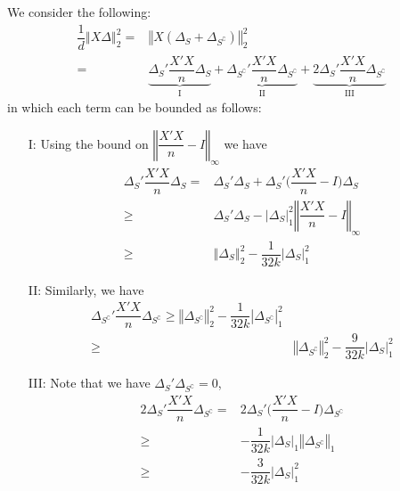 \documentclass[11pt,a4paper]{ctexart}
\numberwithin{equation}{section}%
\begin{document}
We consider the following:
\begin{align*}
    \dfrac{ 1 }{ d } \left\Vert X\Delta \right\Vert _2^2 =& \left\Vert X(\Delta _S+\Delta _{S^\complement}) \right\Vert _2^2 \\
    =& \underbrace{ \Delta _S'\dfrac{ X'X }{ n  } \Delta _S}_{\text{I}} + \underbrace{ \Delta _{S^\complement}'\dfrac{ X'X }{ n  } \Delta _{S^\complement}  }_{\text{II}} + \underbrace{ 2\Delta _S'\dfrac{ X'X }{ n  } \Delta _{S^\complement} }_{\text{III}}
\end{align*}
in which each term can be bounded as follows:
\begin{itemize}[topsep=2pt,itemsep=0pt]
    \item[I:] Using the bound on $  \left\Vert \dfrac{ X'X }{ n  } -I  \right\Vert _\infty $ we have
    \begin{align*}
        \Delta _S'\dfrac{ X'X }{ n  } \Delta _S =& \Delta _S'\Delta _S + \Delta _S'\bigl(\dfrac{ X'X }{ n  } -I\bigr)\Delta _S \\
        \geq & \Delta _S'\Delta _S - \left\vert \Delta _S \right\vert _1^2 \left\Vert \dfrac{ X'X }{ n  } -I  \right\Vert _\infty \\
        \geq & \left\Vert \Delta _S  \right\Vert _2^2 - \dfrac{ 1 }{ 32k } \left\vert \Delta _S \right\vert _1^2 
    \end{align*}
    \item[II:] Similarly, we have
    \begin{align*}
        \Delta _{S^\complement}'\dfrac{ X'X }{ n  } \Delta _{S^\complement} \geq \left\Vert \Delta _{S^\complement}  \right\Vert _2^2 - \dfrac{ 1 }{ 32k } \left\vert \Delta _{S^\complement} \right\vert _1^2 \\
        \geq & \left\Vert \Delta _{S^\complement}  \right\Vert _2^2 - \dfrac{ 9 }{ 32k } \left\vert \Delta _{S} \right\vert _1^2
    \end{align*}
    \item[III:] Note that we have $ \Delta _S'\Delta _{S^\complement}=0 $,
    \begin{align*}
         2\Delta _S'\dfrac{ X'X }{ n  } \Delta _{S^\complement} =& 2 \Delta _S'\bigl(\dfrac{ X'X }{ n  } - I \bigr)\Delta _{S^\complement} \\
         \geq & -\dfrac{ 1 }{ 32k } \left\vert \Delta _S \right\vert _1 \left\Vert \Delta _{S^\complement} \right\Vert _1\\
         \geq & -\dfrac{ 3 }{ 32k } \left\vert \Delta _S \right\vert _1 ^2
    \end{align*}
    
\end{itemize}
\end{document}
